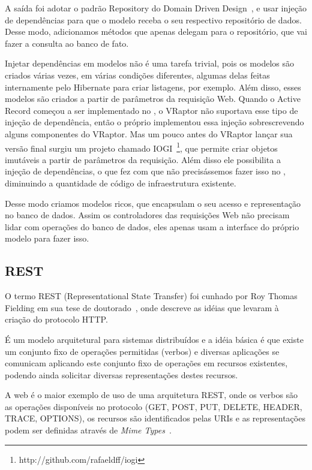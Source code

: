 A saída foi adotar o padrão Repository do Domain Driven Design~\cite{ddd}, e usar injeção de dependências para
que o modelo receba o seu respectivo repositório de dados. Desse modo, adicionamos métodos que apenas delegam para o
repositório, que vai fazer a consulta ao banco de fato.

Injetar dependências em modelos não é uma tarefa trivial, pois os modelos são criados várias vezes, em várias condições
diferentes, algumas delas feitas internamente pelo Hibernate para criar listagens, por exemplo. Além disso, esses
modelos são criados a partir de parâmetros da requisição Web. Quando o Active Record começou a ser implementado no 
\calopsita, o VRaptor não suportava esse tipo de injeção de dependência, então o próprio \calopsita implementou essa
injeção sobrescrevendo alguns componentes do VRaptor. Mas um pouco antes do VRaptor lançar sua versão final surgiu
um projeto \opensource chamado IOGI~\footnote{http://github.com/rafaeldff/iogi}, que permite criar objetos imutáveis 
a partir de parâmetros da requisição.
Além disso ele possibilita a injeção de dependências, o que fez com que não precisássemos fazer isso no \calopsita,
diminuindo a quantidade de código de infraestrutura existente.

Desse modo criamos modelos ricos, que encapsulam o seu acesso e representação no banco de dados. Assim os controladores
das requisições Web não precisam lidar com operações do banco de dados, eles apenas usam a interface do próprio modelo
para fazer isso.

\subsection{REST}
O termo REST (Representational State Transfer) foi cunhado por Roy Thomas Fielding em sua tese de doutorado~\cite{rest-roy}, 
onde descreve as idéias que levaram à criação do protocolo HTTP.

É um modelo arquitetural para sistemas distribuídos e a idéia básica é que existe um conjunto fixo de operações permitidas 
(verbos) e diversas aplicações se comunicam aplicando este conjunto fixo de operações em recursos existentes, podendo ainda 
solicitar diversas representações destes recursos.

A web é o maior exemplo de uso de uma arquitetura REST, onde os verbos são as operações disponíveis no protocolo (GET, POST,
PUT, DELETE, HEADER, TRACE, OPTIONS), os recursos são identificados pelas URIs e as representações podem ser definidas
através de \textit{Mime Types}~\cite{mimetypes}.

